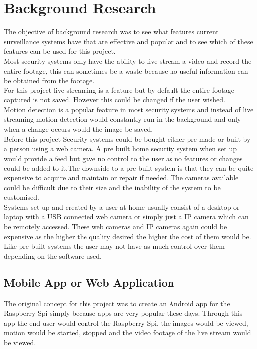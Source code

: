 \documentclass[12pt]{report}
\begin{document}
\section{Background Research}
\label{sec:research}

The objective of background research was to see what features current surveillance systems have that are effective and popular and to see which of these features can be used for this project.\\

Most security systems only have the ability to live stream a video and record the entire footage, this can sometimes be a waste because no useful information can be obtained from the footage.\\ 

For this project live streaming is a feature but by default the entire footage captured is not saved. However this could be changed if the user wished.\\

Motion detection is a popular feature in most security systems and instead of live streaming motion detection would constantly run in the background and only when a change occurs would the image be saved. \\

Before this project Security systems could be bought either pre made or built by a person using a web camera. A pre built home security system when set up would provide a feed but gave no control to the user as no features or changes could be added to it.The downside to a pre built system is that they can be quite expensive to acquire and maintain or repair if needed. The cameras available could be difficult due to their size and the inability of the system to be customised.\\

Systems set up and created by a user at home usually consist of a desktop or laptop with a USB connected web camera or simply just a IP camera which can be remotely accessed. These web cameras and IP cameras again could be expensive as the higher the quality desired the higher the cost of them would be. Like pre built systems the user may not have as much control over them depending on the software used.\\ 

\subsection{Mobile App or Web Application}
\label{subsec:Android}
The original concept for this project was to create an Android app for the Raspberry Spi simply because apps are very popular these days. Through this app the end user would control the Raspberry Spi, the images would be viewed, motion would be started, stopped and the video footage of the live stream would be viewed.\\
\end{document}
